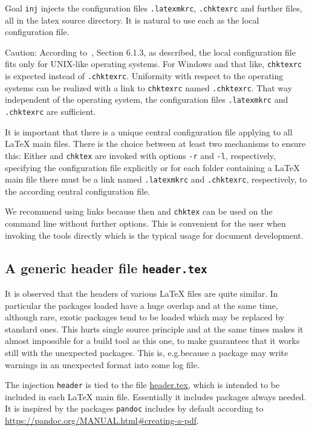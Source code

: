 Goal \texttt{inj} injects the configuration files \texttt{.latexmkrc}, \texttt{.chktexrc} 
and further files, 
all in the latex source directory. 
It is natural to use each as the local configuration file. 

Caution: According to~\cite{ChkTeX22}, Section 6.1.3, 
as described, the local configuration file fits only for UNIX-like operating systems. 
For Windows and that like, \texttt{chktexrc} is expected instead of \texttt{.chktexrc}. 
Uniformity with respect to the operating systems can be realized 
with a link to \texttt{chktexrc} named \texttt{.chktexrc}. 
That way independent of the operating system, 
the configuration files \texttt{.latexmkrc} and \texttt{.chktexrc} are sufficient. 

It is important that there is a unique central configuration file 
applying to all \LaTeX{} main files. 
There is the choice between at least two mechanisms to ensure this: 
Either  and \texttt{chktex} 
are invoked with options \texttt{-r} and \texttt{-l}, respectively, 
specifying the configuration file explicitly 
or for each folder containing a \LaTeX{} main file 
there must be a link named \texttt{.latexmkrc} and \texttt{.chktexrc}, respectively, 
to the according central configuration file. 

We recommend using links because then  and \texttt{chktex} 
can be used on the command line without further options. 
This is convenient for the user when invoking the tools directly 
which is the typical usage for document development. 


\subsection{A generic header file \texttt{header.tex}}\label{subsec:header}

It is observed that the headers of various \LaTeX{} files are quite similar. 
In particular the packages loaded 
have a huge overlap and at the same time, although rare, 
exotic packages tend to be loaded which may be replaced by standard ones. 
This hurts single source principle 
and at the same times makes it almost impossible 
for a build tool as this one, 
to make guarantees that it works still with the unexpected packages. 
This is, e.g.\@ because a package may write warnings 
in an unexpected format into some log file. 

The injection \texttt{header} 
is tied to the file \href{\urlSite fromTex/header.tex}{header.tex}, 
which is intended to be included in each \LaTeX{} main file. 
Essentially it includes packages always needed. 
It is inspired by the packages \texttt{pandoc} includes by default 
according to \url{https://pandoc.org/MANUAL.html#creating-a-pdf}. 

